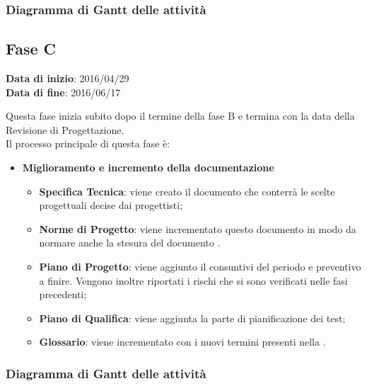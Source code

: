 		
		\subsubsection{Diagramma di Gantt delle attività}
		
	\subsection{Fase C}
	\begin{center}
		\textbf{Data di inizio}: 2016/04/29 \\
		\textbf{Data di fine}: 2016/06/17 \\
	\end{center}
	Questa fase inizia subito dopo il termine della fase B e termina con la data della Revisione di Progettazione. \\
	Il processo principale di questa fase è:
		\begin{itemize}
			\item \textbf{Miglioramento e incremento della documentazione}
			\att
			\begin{itemize}
				\item \textbf{Specifica Tecnica}: viene creato il documento \STdoc che conterrà le scelte progettuali decise dai progettisti;
				\item \textbf{Norme di Progetto}: viene incrementato questo documento in modo da normare anche la stesura del documento \STdoc.
				\item \textbf{Piano di Progetto}: viene aggiunto il consuntivi del periodo e preventivo a finire. Vengono inoltre riportati i rischi che si sono verificati nelle fasi precedenti;
				\item \textbf{Piano di Qualifica}: viene aggiunta la parte di pianificazione dei test;
				\item \textbf{Glossario}: viene incrementato con i nuovi termini presenti nella \STdoc.
			\end{itemize}
		\end{itemize}
		\subsubsection{Diagramma di Gantt delle attività}
		
		
		
